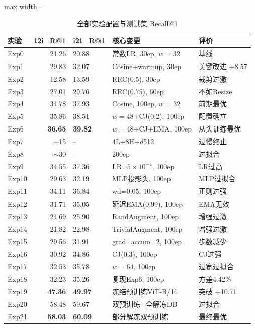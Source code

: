 \documentclass[12pt,a4paper]{article}
\begin{document}
\begin{table}[H]
\centering
\caption{全部实验配置与测试集 Recall@1}
\begin{adjustbox}{max width=\textwidth}
\small
\begin{tabular}{lrlll}
\toprule
\textbf{实验} & \textbf{t2i\_R@1} & \textbf{i2t\_R@1} & \textbf{核心变更} & \textbf{评价} \\
\midrule
Exp0 & 21.26 & 20.88 & 常数LR, 30ep, $w=32$ & 基线 \\
\rowcolor{blue!15}
Exp1 & 29.83 & 32.07 & Cosine+warmup, 30ep & 关键改进 +8.57 \\
Exp2 & 12.58 & 13.59 & RRC(0.5), 30ep & 裁剪过激 \\
Exp3 & 27.01 & 29.76 & RRC(0.75), 60ep & 不如Resize \\
Exp4 & 34.78 & 37.93 & Cosine, 100ep, $w=32$ & 前期最优 \\
Exp5 & 35.86 & 38.51 & $w=48$+CJ(0.2), 100ep & 配置确立 \\
\rowcolor{yellow!30}
Exp6 & \textbf{36.65} & \textbf{39.82} & $w=48$+CJ+EMA, 100ep & 从头训练最优 \\
Exp7 & $\sim$15 & -- & 4L+8H+$d$512 & 过慢终止 \\
Exp8 & $\sim$30 & -- & 200ep & 过拟合 \\
Exp9 & 34.55 & 37.36 & LR=$5\times 10^{-4}$, 100ep & LR过高 \\
Exp10 & 29.63 & 32.19 & MLP投影头, 100ep & MLP过拟合 \\
Exp11 & 34.11 & 36.84 & wd=0.05, 100ep & 正则过强 \\
Exp12 & 31.71 & 35.05 & 延迟EMA(0.99), 100ep & EMA无效 \\
Exp13 & 24.69 & 25.90 & RandAugment, 100ep & 增强过激 \\
Exp14 & 21.82 & 22.98 & TrivialAugment, 100ep & 增强过激 \\
Exp15 & 29.56 & 31.91 & grad\_accum=2, 100ep & 步数减少 \\
Exp16 & 30.92 & 34.86 & CJ(0.3), 100ep & CJ过强 \\
Exp17 & 32.53 & 35.78 & $w=64$, 100ep & 过宽过拟合 \\
Exp18 & 32.23 & 35.26 & 复现Exp6, 100ep & 方差4.42\% \\
\rowcolor{green!30}
Exp19 & \textbf{47.36} & \textbf{49.97} & 冻结预训练ViT-B/16 & 突破 +10.71 \\
Exp20 & 58.48 & 59.67 & 双预训练+全解冻DB & 过拟合 \\
\rowcolor{orange!30}
Exp21 & \textbf{58.03} & \textbf{60.09} & 部分解冻双预训练 & 最终最优 \\
\bottomrule
\end{tabular}
\end{adjustbox}
\end{table}
\end{document}
